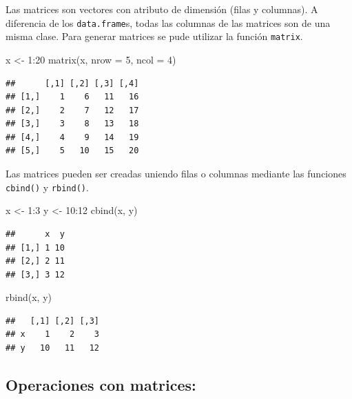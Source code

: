 \documentclass[
]{book}
\newenvironment{Shaded}{\begin{snugshade}}{\end{snugshade}}
\newcommand{\AttributeTok}[1]{\textcolor[rgb]{0.77,0.63,0.00}{#1}}
\newcommand{\DecValTok}[1]{\textcolor[rgb]{0.00,0.00,0.81}{#1}}
\newcommand{\FunctionTok}[1]{\textcolor[rgb]{0.00,0.00,0.00}{#1}}
\newcommand{\NormalTok}[1]{#1}
\newcommand{\OtherTok}[1]{\textcolor[rgb]{0.56,0.35,0.01}{#1}}
\newcommand{\SpecialCharTok}[1]{\textcolor[rgb]{0.00,0.00,0.00}{#1}}
\begin{document}
Las matrices son vectores con atributo de dimensión (filas y columnas). A diferencia de los \texttt{data.frame}s, todas las columnas de las matrices son de una misma clase. Para generar matrices se pude utilizar la función \texttt{matrix}.

\begin{Shaded}
\begin{Highlighting}[]
\NormalTok{x }\OtherTok{\textless{}{-}} \DecValTok{1}\SpecialCharTok{:}\DecValTok{20}
\FunctionTok{matrix}\NormalTok{(x, }\AttributeTok{nrow =} \DecValTok{5}\NormalTok{, }\AttributeTok{ncol =} \DecValTok{4}\NormalTok{)}
\end{Highlighting}
\end{Shaded}

\begin{verbatim}
##      [,1] [,2] [,3] [,4]
## [1,]    1    6   11   16
## [2,]    2    7   12   17
## [3,]    3    8   13   18
## [4,]    4    9   14   19
## [5,]    5   10   15   20
\end{verbatim}

Las matrices pueden ser creadas uniendo filas o columnas mediante las funciones \texttt{cbind()} y \texttt{rbind()}.

\begin{Shaded}
\begin{Highlighting}[]
\NormalTok{x }\OtherTok{\textless{}{-}} \DecValTok{1}\SpecialCharTok{:}\DecValTok{3}
\NormalTok{y }\OtherTok{\textless{}{-}} \DecValTok{10}\SpecialCharTok{:}\DecValTok{12}
\FunctionTok{cbind}\NormalTok{(x, y)}
\end{Highlighting}
\end{Shaded}

\begin{verbatim}
##      x  y
## [1,] 1 10
## [2,] 2 11
## [3,] 3 12
\end{verbatim}

\begin{Shaded}
\begin{Highlighting}[]
\FunctionTok{rbind}\NormalTok{(x, y)}
\end{Highlighting}
\end{Shaded}

\begin{verbatim}
##   [,1] [,2] [,3]
## x    1    2    3
## y   10   11   12
\end{verbatim}

\hypertarget{operaciones-con-matrices}{%
\subsection{Operaciones con matrices:}\label{operaciones-con-matrices}}
\end{document}
